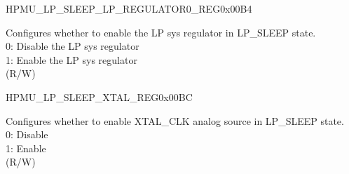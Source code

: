 \begin{register}{H}{PMU\_LP\_SLEEP\_LP\_REGULATOR0\_REG}{0x00B4}\label{regdesc:PMULPSLEEPLPREGULATOR0REG}
%
%
%
%
%
\regnewline%
\begin{regdesc}\begin{reglist}
\label{fielddesc:PMULPSLEEPLPREGULATORXPD}\item [PMU\_LP\_SLEEP\_LP\_REGULATOR\_XPD] Configures whether to enable the LP sys regulator in LP\_SLEEP state.\\
0: Disable the LP sys regulator\\
1: Enable the LP sys regulator\\
(R/W)
\end{reglist}\end{regdesc}
\end{register}


\begin{register}{H}{PMU\_LP\_SLEEP\_XTAL\_REG}{0x00BC}\label{regdesc:PMULPSLEEPXTALREG}
%
%
\regnewline%
\begin{regdesc}\begin{reglist}
\label{fielddesc:PMULPSLEEPXPDXTAL}\item [PMU\_LP\_SLEEP\_XPD\_XTAL] Configures whether to enable XTAL\_CLK analog source in LP\_SLEEP state.\\
0: Disable\\
1: Enable\\
(R/W)
\end{reglist}\end{regdesc}
\end{register}


